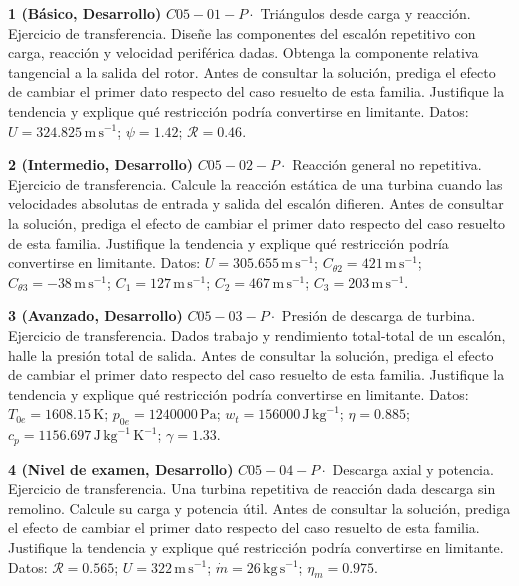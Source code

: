 \documentclass[10pt,openany]{book}
\begin{document}
\begin{tcolorbox}[title={Ejercicios propuestos}, studiumworked, breakable]

\noindent\textbf{1 (Básico, Desarrollo)}
\(C05-01-P \cdot\) Triángulos desde carga y reacción. Ejercicio de transferencia. Diseñe las componentes del escalón repetitivo con carga, reacción y velocidad periférica dadas. Obtenga la componente relativa tangencial a la salida del rotor. Antes de consultar la solución, prediga el efecto de cambiar el primer dato respecto del caso resuelto de esta familia. Justifique la tendencia y explique qué restricción podría convertirse en limitante. Datos: \(U=324.825\, \mathrm{m}\,\mathrm{s}^{-1}\); \(\psi=1.42\); \(\mathcal R=0.46\).

\noindent\textbf{2 (Intermedio, Desarrollo)}
\(C05-02-P \cdot\) Reacción general no repetitiva. Ejercicio de transferencia. Calcule la reacción estática de una turbina cuando las velocidades absolutas de entrada y salida del escalón difieren. Antes de consultar la solución, prediga el efecto de cambiar el primer dato respecto del caso resuelto de esta familia. Justifique la tendencia y explique qué restricción podría convertirse en limitante. Datos: \(U=305.655\, \mathrm{m}\,\mathrm{s}^{-1}\); \(C_{\theta2}=421\, \mathrm{m}\,\mathrm{s}^{-1}\); \(C_{\theta3}=-38\, \mathrm{m}\,\mathrm{s}^{-1}\); \(C_1=127\, \mathrm{m}\,\mathrm{s}^{-1}\); \(C_2=467\, \mathrm{m}\,\mathrm{s}^{-1}\); \(C_3=203\, \mathrm{m}\,\mathrm{s}^{-1}\).

\noindent\textbf{3 (Avanzado, Desarrollo)}
\(C05-03-P \cdot\) Presión de descarga de turbina. Ejercicio de transferencia. Dados trabajo y rendimiento total-total de un escalón, halle la presión total de salida. Antes de consultar la solución, prediga el efecto de cambiar el primer dato respecto del caso resuelto de esta familia. Justifique la tendencia y explique qué restricción podría convertirse en limitante. Datos: \(T_{0e}=1608.15\, \mathrm{K}\); \(p_{0e}=1240000\, \mathrm{Pa}\); \(w_t=156000\, \mathrm{J}\,\mathrm{kg}^{-1}\); \(\eta=0.885\); \(c_p=1156.697\, \mathrm{J}\,\mathrm{kg}^{-1}\,\mathrm{K}^{-1}\); \(\gamma=1.33\).

\noindent\textbf{4 (Nivel de examen, Desarrollo)}
\(C05-04-P \cdot\) Descarga axial y potencia. Ejercicio de transferencia. Una turbina repetitiva de reacción dada descarga sin remolino. Calcule su carga y potencia útil. Antes de consultar la solución, prediga el efecto de cambiar el primer dato respecto del caso resuelto de esta familia. Justifique la tendencia y explique qué restricción podría convertirse en limitante. Datos: \(\mathcal R=0.565\); \(U=322\, \mathrm{m}\,\mathrm{s}^{-1}\); \(\dot m=26\, \mathrm{kg}\,\mathrm{s}^{-1}\); \(\eta_m=0.975\).
\end{tcolorbox}
\end{document}
